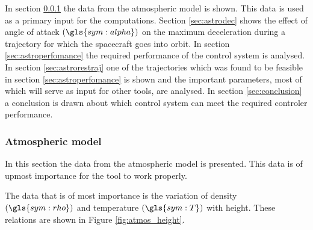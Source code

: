 In section \ref{sec:astroatmos} the data from the atmospheric model is shown. This data is used as a primary input for the computations. Section \ref{sec:astrodec} shows the effect of angle of attack $\left(\gls{sym:alpha}\right)$ on the maximum deceleration during a trajectory for which the spacecraft goes into orbit. In section \ref{sec:astroperfomance} the required performance of the control system is analysed. In section \ref{sec:astrorestraj} one of the trajectories which was found to be feasible in section \ref{sec:astroperfomance} is shown and the important parameters, most of which will serve as input for other tools, are analysed. In section \ref{sec:conclusion} a conclusion is drawn about which control system can meet the required controler performance.

\subsubsection{Atmospheric model}
\label{sec:astroatmos}

In this section the data from the atmospheric model is presented. This data is of upmost importance for the tool to work properly.

The data that is of most importance is the variation of density $\left(\gls{sym:rho}\right)$ and temperature $\left(\gls{sym:T}\right)$ with height. These relations are shown in Figure \ref{fig:atmos_height}.

